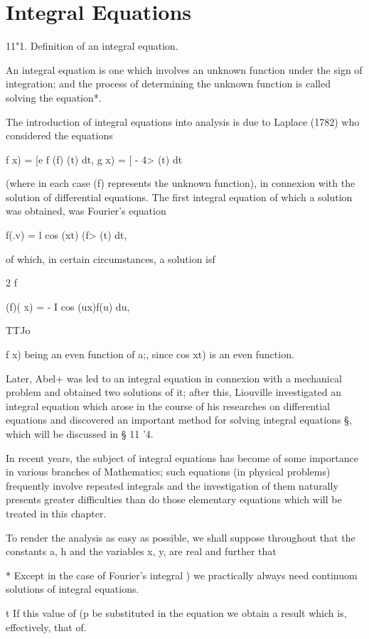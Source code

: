 \chapter{Integral Equations} 

11"1. Definition of an integral equation.

An integral equation is one which involves an unknown function under
the sign of integration; and the process of determining the unknown
function is called solving the equation*.

The introduction of integral equations into analysis is due to Laplace
(1782) who considered the equations

f x) = [e f (f) (t) dt, g x) = [ - 4> (t) dt

(where in each case (f) represents the unknown function), in connexion
with the solution of differential equations. The first integral
equation of which a solution was obtained, was Fourier's equation

f(.v) = l cos (xt) (f> (t) dt,

of which, in certain circumstances, a solution isf

2 f

(f)( x) = - I cos (ux)f(u) du,

TTJo

f x) being an even function of a;, since cos xt) is an even function.

Later, Abel+ was led to an integral equation in connexion with a
mechanical problem and obtained two solutions of it; after this,
Liouville investigated an integral equation which arose in the course
of his researches on differential equations and discovered an
important method for solving integral equations §, which will be
discussed in § 11 '4.

In recent years, the subject of integral equations has become of some
importance in various branches of Mathematics; such equations (in
physical problems) frequently involve repeated integrals and the
investigation of them naturally presents greater difficulties than do
those elementary equations which will be treated in this chapter.

To render the analysis as easy as possible, we shall suppose
throughout that the constants a, h and the variables x, y, are real
and further that

* Except in the case of Fourier's integral ) we practically
always need continuom solutions of integral equations.

t If this value of (p be substituted in the equation we obtain a
result which is, effectively, that of.

